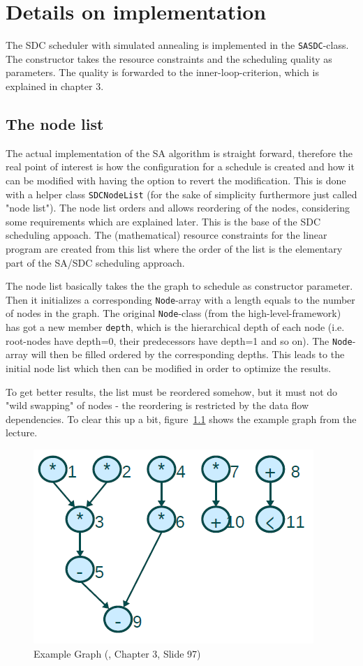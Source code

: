 \documentclass[colorback,accentcolor=tud1c,11pt]{tudreport}
\newcommand\code[1]{\texttt{#1}}
\begin{document}
\chapter{Details on implementation}

The SDC scheduler with simulated annealing is implemented in the \code{SASDC}-class. The constructor takes the resource constraints and the scheduling quality as parameters. The quality is forwarded to the inner-loop-criterion, which is explained in chapter 3.\par

\section{The node list}
The actual implementation of the SA algorithm is straight forward, therefore the real point of interest is how the configuration for a schedule is created and how it can be modified with having the option to revert the modification. This is done with a helper class \code{SDCNodeList} (for the sake of simplicity furthermore just called "node list"). The node list orders and allows reordering of the nodes, considering some requirements which are explained later. This is the base of the SDC scheduling appoach. The (mathematical) resource constraints for the linear program are created from this list where the order of the list is the elementary part of the SA/SDC scheduling approach.\par
The node list basically takes the the graph to schedule as constructor parameter. Then it initializes a corresponding \code{Node}-array with a length equals to the number of nodes in the graph. The original \code{Node}-class (from the high-level-framework) has got a new member \code{depth}, which is the hierarchical depth of each node (i.e. root-nodes have depth=0, their predecessors have depth=1 and so on). The \code{Node}-array will then be filled ordered by the corresponding depths. This leads to the initial node list which then can be modified in order to optimize the results.\par
To get better results, the list must be reordered somehow, but it must not do "wild swapping" of nodes - the reordering is restricted by the data flow dependencies. To clear this up a bit, figure~\ref{fig:lecturegraph} shows the example graph from the lecture.
\begin{figure}
	\centering
	\includegraphics{lecturegraph.png}
	\caption{Example Graph (\cite{Hochberger2017}, Chapter 3, Slide 97)}
	\label{fig:lecturegraph}
\end{figure}
\end{document}
